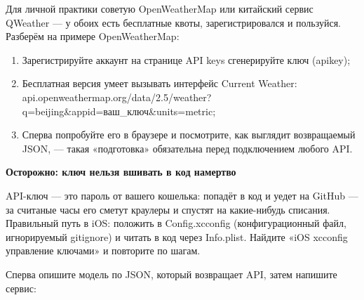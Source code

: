 


Для личной практики советую OpenWeatherMap или китайский сервис QWeather — у обоих есть бесплатные квоты, зарегистрировался и пользуйся. Разберём на примере OpenWeatherMap:

\begin{enumerate}
  \item Зарегистрируйте аккаунт на странице API keys сгенерируйте ключ (apikey);
  \item Бесплатная версия умеет вызывать интерфейс Current Weather: api.openweathermap.org/data/2.5/weather? q=beijing\&appid=ваш\_ключ\&units=metric;
  \item Сперва попробуйте его в браузере и посмотрите, как выглядит возвращаемый JSON, — такая «подготовка» обязательна перед подключением любого API.
\end{enumerate}

\textbf{Осторожно: ключ нельзя вшивать в код намертво}\par

API-ключ — это пароль от вашего кошелька: попадёт в код и уедет на GitHub — за считаные часы его сметут краулеры и спустят на какие-нибудь списания. Правильный путь в iOS: положить в Config.xcconfig (конфигурационный файл, игнорируемый gitignore) и читать в код через Info.plist. Найдите «iOS xcconfig управление ключами» и повторите по шагам.


Сперва опишите модель по JSON, который возвращает API, затем напишите сервис:


